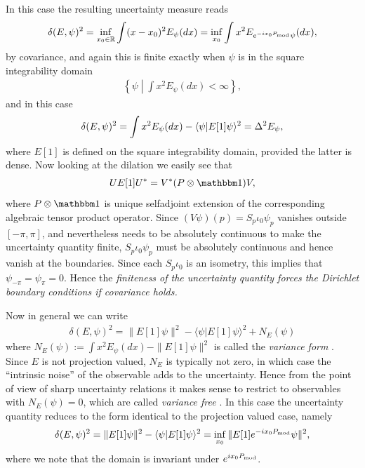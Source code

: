 In this case the resulting uncertainty measure reads
\begin{align}
  \delta(E,\psi)^2 = \inf_{x_0\in \mathbb R} \int (x-x_0)^2 E_\psi(dx) = \inf_{x_0}\int x^2 E_{e^{-ix_0P_{\mathrm{mod}}}\psi}(dx),
\end{align}
by covariance, and again this is finite exactly when $\psi$ is in the square integrability domain
\begin{align}
  \left\{ \psi\middle | \int x^2 E_{\psi}(dx) <\infty\right\},
\end{align}
and in this case
\begin{align}
  \delta(E,\psi)^2 = \int x^2 E_\psi(dx) - \langle \psi| E[1]\psi\rangle^2 = \var{E_\psi},
\end{align}
where $E[1]$ is defined on the square integrability domain, provided the latter is dense. Now looking at the dilation we easily see that
\begin{align}
  UE[1]U^* = V^*(P\otimes \id)V,
\end{align}
where $P\otimes \id$ is unique selfadjoint extension of the corresponding algebraic tensor product operator. Since $(V\psi)(p)= S_p\iota_0\psi_p$ vanishes outside $[-\pi,\pi]$, and nevertheless needs to be absolutely continuous to make the uncertainty quantity finite,  $S_p\iota_0\psi_p$ must be absolutely continuous and hence vanish at the boundaries. Since each $S_p\iota_0$ is an isometry, this implies that $\psi_{-\pi}=\psi_{\pi}=0$. Hence the \emph{finiteness of the uncertainty quantity forces the Dirichlet boundary conditions if covariance holds.}

Now in general we can write 
\begin{align}
  \delta(E,\psi)^2 = \|E[1]\psi\|^2 - \langle \psi| E[1]\psi\rangle^2 + N_E(\psi)
\end{align}
where $N_E(\psi) := \int x^2 E_\psi(dx) -\|E[1]\psi\|^2$ is called the \emph{variance form} \cite{werner-screen-obs}. Since $E$ is not projection valued, $N_E$ is typically not zero, in which case the ``intrinsic noise'' of the observable adds to the uncertainty. Hence from the point of view of sharp uncertainty relations it makes sense to restrict to observables with $N_E(\psi)=0$, which are called \emph{variance free} \cite{}. In this case the uncertainty quantity reduces to the form identical to the projection valued case, namely
\begin{align}
  \delta(E,\psi)^2 = \|E[1]\psi\|^2 - \langle \psi| E[1]\psi\rangle^2 = \inf_{x_0} \| E[1]e^{-ix_0P_{\mathrm{mod}}}\psi\|^2,
\end{align}
where we note that the domain is invariant under $e^{ix_0P_{\mathrm{mod}}}$.

